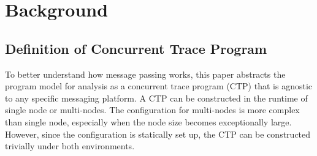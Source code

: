

\section{Background}

\begin{comment}
Message passing is widely applied in computing tasks within a single node and/or among multiple nodes.
The message passing standard such as MPI does not treat the intra-node communication and the inter-node communication differently.
In other words, sends and receives are matched with the same criteria, thus the semantics under both communications are equivalent. Note that there might be side effects for the multiple nodes to work, such as the node configuration, especially when the count of nodes reaches a very large bound. However, these effects are not related to match pair generation so is out of the scope in this paper. 
Therefore, this paper assumes a single node environment exists for all the following programs and the discussed approach can be extended to multiple nodes environment.

The runtime configuration for multi-nodes is more complex than single node, especially when the node size becomes exceptionally large. However, since the configuration is statically set up, the CTP is constructed trivially under any node environment. 
\end{comment}


\subsection{Definition of Concurrent Trace Program}

To better understand how message passing works, this paper abstracts the program model for analysis as a concurrent trace program (CTP) that is agnostic to any specific messaging platform. 
A CTP can be constructed in the runtime of single node or multi-nodes.
The configuration for multi-nodes is more complex than single node, especially when the node size becomes exceptionally large. However, since the configuration is statically set up, the CTP can be constructed trivially under both environments. 

